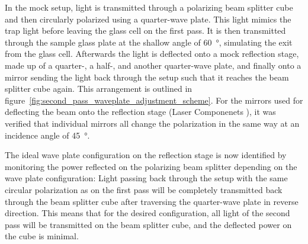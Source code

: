 In the mock setup, light is transmitted through a polarizing beam splitter cube and then circularly polarized using a quarter-wave plate. This light mimics the trap light before leaving the glass cell on the first pass. It is then transmitted through the sample glass plate at the shallow angle of \SI{60}{\degree}, simulating the exit from the glass cell. Afterwards the light is deflected onto a mock reflection stage, made up of a quarter-, a half-, and another quarter-wave plate, and finally onto a mirror sending the light back through the setup such that it reaches the beam splitter cube again. This arrangement is outlined in figure~\ref{fig:second_pass_waveplate_adjustment_scheme}. For the mirrors used for deflecting the beam onto the reflection stage (Laser Componenets ), it was verified that individual mirrors all change the polarization in the same way at an incidence angle of \SI{45}{\degree}.

The ideal wave plate configuration on the reflection stage is now identified by monitoring the power reflected on the polarizing beam splitter depending on the wave plate configuration: Light passing back through the setup with the same circular polarization as on the first pass will be completely transmitted back through the beam splitter cube after traversing the quarter-wave plate in reverse direction. This means that for the desired configuration, all light of the second pass will be transmitted on the beam splitter cube, and the deflected power on the cube is minimal.

